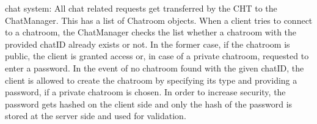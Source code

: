 chat system:
All chat related requests get transferred by the CHT to the ChatManager. This has a list of Chatroom objects. When a client tries to connect to a chatroom, the ChatManager checks the list whether a chatroom with the provided chatID already exists or not. In the former case, 
if the chatroom is public, the client is granted access or, in case of a private chatroom, requested to enter a password. In the event of no chatroom found with the given chatID, the client is allowed to create the chatroom by specifying its type and providing a password, if a private chatroom is chosen. In order to increase security, the password gets hashed on the client side and only the hash of the password is stored at the server side and used for validation.

